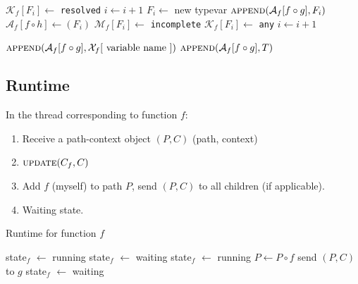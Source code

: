 \documentclass[10pt]{article}
\begin{document}
\begin{algorithm}
\begin{algorithmic}[1]
						\State $\mathcal{K}_f[F_i] \gets $ \texttt{resolved}
						\State $i \gets i+1$
						\State $F_i \gets $ new typevar
						\State $\Call{append}{\mathcal{A}_f[f \circ g], F_i}$
						\State $\mathcal{A}_f[f \circ h] \gets (F_i)$
						\State $\mathcal{M}_f[F_i] \gets $ \texttt{incomplete}
						\State $\mathcal{K}_f[F_i] \gets $ \texttt{any}
						\State $i \gets i+1$

						\State $\Call{append}{\mathcal{A}_f[f \circ g],
						\mathcal{X}_f[$ variable name $]}$ 
						\State $\Call{append}{\mathcal{A}_f[f \circ g], T}$
					\EndIf
				\EndFor
			\EndFor
		\EndFunction
	\end{algorithmic}
\end{algorithm}

\subsection{Runtime}

In the thread corresponding to function $f$:

\begin{enumerate}[noitemsep]
	\item  Receive a path-context object $(P, C)$ (path, context)


	\item $\Call{update}{C_f, C}$

	\item Add $f$ (myself) to path $P$, send $(P, C)$ to all children (if
		applicable).

	\item Waiting state.
\end{enumerate}

\begin{algorithm}
	\caption{Runtime for function $f$}
	\begin{algorithmic}[1]
		\Statex
		\State state$_f$ $\gets$ running
		\State {}
		\State state$_f$ $\gets$ waiting
			\State state$_f$ $\gets$ running
			\State {}
			\State $P \gets P \circ f$ 
				\State send $(P, C)$ to $g$
			\EndFor
			\State state$_f$ $\gets$ waiting 
		\EndWhile
			\State {}
		\EndIf
		\EndFunction
	\end{algorithmic}
\end{algorithm}
\end{document}
